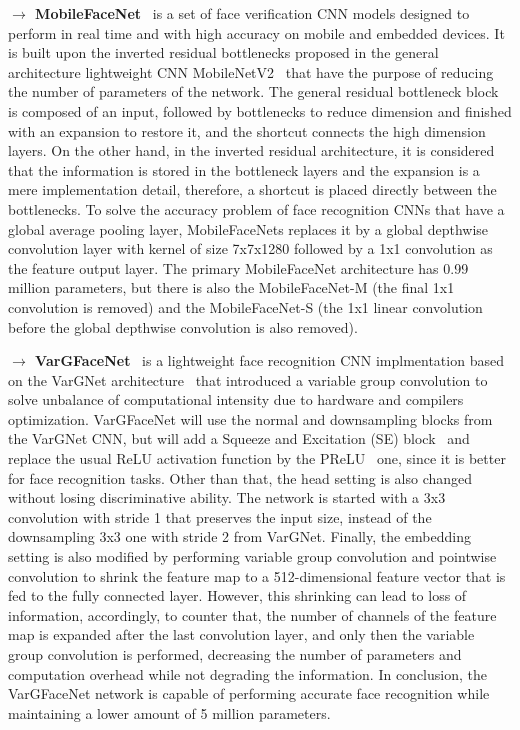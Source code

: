 \documentclass[class=report, crop=false, a4paper, 12pt]{standalone}
\begin{document}
\vspace{0.7\baselineskip}
\label{mobilefacenet}
\noindent\textbf{$\rightarrow$ MobileFaceNet}~\autocite{chenMobileFaceNetsEfficientCNNs2018} is a set of face verification CNN models designed to perform in real time and with high accuracy on mobile and embedded devices. It is built upon the inverted residual bottlenecks proposed in the general architecture lightweight CNN MobileNetV2~\autocite{sandlerMobileNetV2InvertedResiduals2019} that have the purpose of reducing the number of parameters of the network. The general residual bottleneck block~\autocite{heDeepResidualLearning2016} is composed of an input, followed by bottlenecks to reduce dimension and finished with an expansion to restore it, and the shortcut connects the high dimension layers. On the other hand, in the inverted residual architecture, it is considered that the information is stored in the bottleneck layers and the expansion is a mere implementation detail, therefore, a shortcut is placed directly between the bottlenecks. To solve the accuracy problem of face recognition CNNs that have a global average pooling layer, MobileFaceNets replaces it by a global depthwise convolution layer with kernel of size 7x7x1280 followed by a 1x1 convolution as the feature output layer. The primary MobileFaceNet architecture has 0.99 million parameters, but there is also the MobileFaceNet-M (the final 1x1 convolution is removed) and the MobileFaceNet-S (the 1x1 linear convolution before the global depthwise convolution is also removed).

\newpage
\noindent\textbf{$\rightarrow$ VarGFaceNet}~\autocite{yanVarGFaceNetEfficientVariable2019} is a lightweight face recognition CNN implmentation based on the VarGNet architecture~\autocite{zhangVarGNetVariableGroup2020} that introduced a variable group convolution to solve unbalance of computational intensity due to hardware and compilers optimization. VarGFaceNet will use the normal and downsampling blocks from the VarGNet CNN, but will add a Squeeze and Excitation (SE) block~\autocite{huSqueezeandExcitationNetworks2019} and replace the usual ReLU activation function by the PReLU~\autocite{heDelvingDeepRectifiers2015} one, since it is better for face recognition tasks. Other than that, the head setting is also changed without losing discriminative ability. The network is started with a 3x3 convolution with stride 1 that preserves the input size, instead of the downsampling 3x3 one with stride 2 from VarGNet. Finally, the embedding setting is also modified by performing variable group convolution and pointwise convolution to shrink the feature map to a 512-dimensional feature vector that is fed to the fully connected layer. However, this shrinking can lead to loss of information, accordingly, to counter that, the number of channels of the feature map is expanded after the last convolution layer, and only then the variable group convolution is performed, decreasing the number of parameters and computation overhead while not degrading the information. In conclusion, the VarGFaceNet network is capable of performing accurate face recognition while maintaining a lower amount of 5 million parameters.
\end{document}
